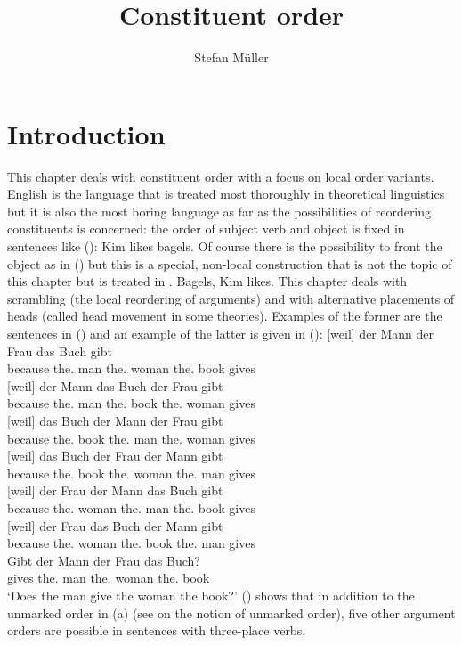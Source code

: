 \documentclass[output=paper]{langsci/langscibook}
\author{%
	Stefan Müller\affiliation{Humboldt-Universität zu Berlin}%
}
\title{Constituent order}
\begin{document}
\label{chap-order}

\section{Introduction} 

This chapter deals with constituent order with a focus on local order variants. English is the
language that is treated most thoroughly in theoretical linguistics but it is also the most boring
language as far as the possibilities of reordering constituents is concerned: the order of subject
verb and object is fixed in sentences like ():
\ea
Kim likes bagels.
\z
Of course there is the possibility to front the object as in () but this is a special,
non-local construction that is not the topic of this chapter but is treated in .
\ea
Bagels, Kim likes.
\z
This chapter deals with scrambling (the local reordering of arguments) and with alternative
placements of heads (called head movement in some theories). Examples of the former are the
sentences in () and an example of the latter is given in ():
\eal
\label{ex-permutation-mf}
\ex 
\gll {}[weil]          der Mann der Frau das Buch gibt\\
     \spacebr{}because the.\NOM{} man the.\DAT{} woman the.\ACC{} book gives\\
\ex 
\gll {}[weil]          der Mann das Buch der Frau  gibt\\
     \spacebr{}because the.\NOM{} man  the.\ACC{} book the.\DAT{} woman gives\\
\ex 
\gll {}[weil]          das Buch der Mann der Frau  gibt\\
     \spacebr{}because the.\ACC{} book the.\NOM{} man  the.\DAT{} woman gives\\
\ex 
\gll {}[weil]          das Buch der Frau  der Mann gibt\\
     \spacebr{}because the.\ACC{} book the.\DAT{} woman the.\NOM{} man  gives\\
\ex 
\gll {}[weil]          der Frau  der Mann das Buch gibt\\
     \spacebr{}because the.\DAT{} woman the.\NOM{} man  the.\ACC{} book gives\\
\ex 
\gll {}[weil]          der Frau  das Buch der Mann gibt\\
     \spacebr{}because the.\DAT{} woman the.\ACC{} book the.\NOM{} man  gives\\
\zl
\ea
\gll Gibt der Mann der Frau das Buch?\\
     gives the.\NOM{} man the.\DAT{} woman the.\ACC{} book\\
\glt `Does the man give the woman the book?'
\z
() shows that in addition to the unmarked order in (a) (see  on the
notion of unmarked order), five other argument orders are possible in sentences with three-place verbs.
\end{document}
